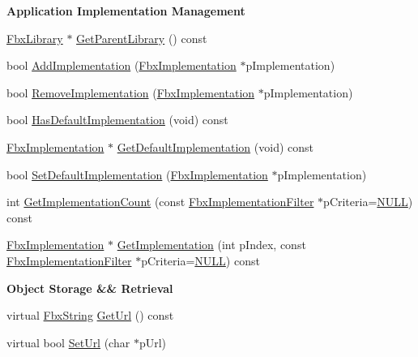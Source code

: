 \begin{Indent}\textbf{ Application Implementation Management}\par
\begin{DoxyCompactItemize}
\item 
\hyperlink{class_fbx_library}{Fbx\+Library} $\ast$ \hyperlink{class_fbx_object_a858b87f791a3440fb9c24d3b4593935d}{Get\+Parent\+Library} () const
\item 
bool \hyperlink{class_fbx_object_a83138088781da53eb6fc3e3793ca9171}{Add\+Implementation} (\hyperlink{class_fbx_implementation}{Fbx\+Implementation} $\ast$p\+Implementation)
\item 
bool \hyperlink{class_fbx_object_af5372f14b186dbd1e69688e899c46081}{Remove\+Implementation} (\hyperlink{class_fbx_implementation}{Fbx\+Implementation} $\ast$p\+Implementation)
\item 
bool \hyperlink{class_fbx_object_a9703e0631381d9bbc91cac102198cf36}{Has\+Default\+Implementation} (void) const
\item 
\hyperlink{class_fbx_implementation}{Fbx\+Implementation} $\ast$ \hyperlink{class_fbx_object_afc23e0f703b4a4e963f3edc95a02c825}{Get\+Default\+Implementation} (void) const
\item 
bool \hyperlink{class_fbx_object_ac216eb622d77659c18092b202632aaa9}{Set\+Default\+Implementation} (\hyperlink{class_fbx_implementation}{Fbx\+Implementation} $\ast$p\+Implementation)
\item 
int \hyperlink{class_fbx_object_add119a7c5623e087101589ebbc0a65ed}{Get\+Implementation\+Count} (const \hyperlink{class_fbx_implementation_filter}{Fbx\+Implementation\+Filter} $\ast$p\+Criteria=\hyperlink{fbxarch_8h_a070d2ce7b6bb7e5c05602aa8c308d0c4}{N\+U\+LL}) const
\item 
\hyperlink{class_fbx_implementation}{Fbx\+Implementation} $\ast$ \hyperlink{class_fbx_object_a396d7a8496c2eef786ce73bac59ab55a}{Get\+Implementation} (int p\+Index, const \hyperlink{class_fbx_implementation_filter}{Fbx\+Implementation\+Filter} $\ast$p\+Criteria=\hyperlink{fbxarch_8h_a070d2ce7b6bb7e5c05602aa8c308d0c4}{N\+U\+LL}) const
\end{DoxyCompactItemize}
\end{Indent}
\begin{Indent}\textbf{ Object Storage \&\& Retrieval}\par
\begin{DoxyCompactItemize}
\item 
virtual \hyperlink{class_fbx_string}{Fbx\+String} \hyperlink{class_fbx_object_acce60f1ae8d6b0ffba2de85c04766194}{Get\+Url} () const
\item 
virtual bool \hyperlink{class_fbx_object_a414b0f4a9568636192a9063a13f8a61a}{Set\+Url} (char $\ast$p\+Url)
\end{DoxyCompactItemize}
\end{Indent}
